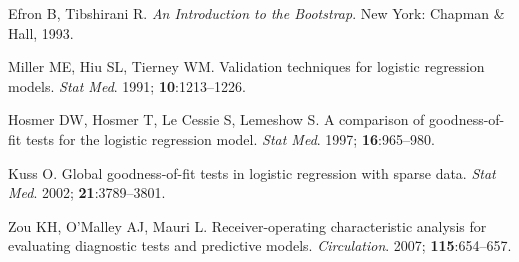 \documentclass[12pt]{article}
\begin{document}
\begin{thebibliography}{99}
Efron B, Tibshirani R. \textit{An Introduction to the Bootstrap}. New York: Chapman \& Hall, 1993.

Miller ME, Hiu SL, Tierney WM. Validation techniques for logistic regression models. \textit{Stat Med}. 1991; \textbf{10}:1213–1226.

Hosmer DW, Hosmer T, Le Cessie S, Lemeshow S. A comparison of goodness-of-fit tests for the logistic regression model. \textit{Stat Med}. 1997; \textbf{16}:965–980.

Kuss O. Global goodness-of-fit tests in logistic regression with sparse data. \textit{Stat Med}. 2002; \textbf{21}:3789–3801.

Zou KH, O'Malley AJ, Mauri L. Receiver-operating characteristic analysis for evaluating diagnostic tests and predictive models. \textit{Circulation}. 2007; \textbf{115}:654–657.

\end{thebibliography}
\end{document}
